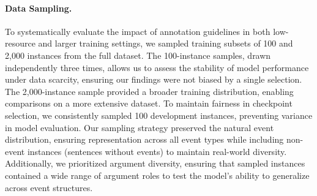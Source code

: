 \paragraph{Data Sampling.} 
To systematically evaluate the impact of annotation guidelines in both low-resource and larger training settings, we sampled training subsets of 100 and 2,000 instances from the full dataset. The 100-instance samples, drawn independently three times, allows us to assess the stability of model performance under data scarcity, ensuring our findings were not biased by a single selection. The 2,000-instance sample provided a broader training distribution, enabling comparisons on a more extensive dataset. To maintain fairness in checkpoint selection, we consistently sampled 100 development instances, preventing variance in model evaluation. Our sampling strategy preserved the natural event distribution, ensuring representation across all event types while including non-event instances (sentences without events) to maintain real-world diversity. Additionally, we prioritized argument diversity, ensuring that sampled instances contained a wide range of argument roles to test the model's ability to generalize across event structures.




